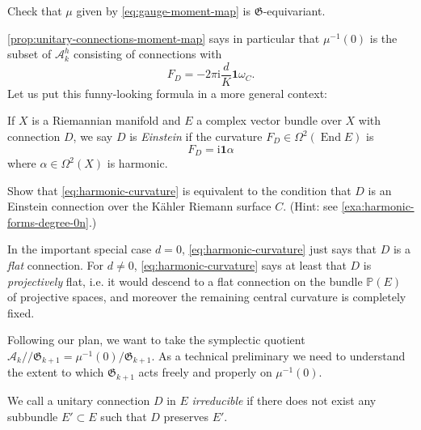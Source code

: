 \documentclass[12pt,letterpaper,reqno]{article}
\numberwithin{equation}{section}
\newcommand{\fG}{{\mathfrak G}}
\newcommand{\cA}{\ensuremath{\mathcal A}}
\newcommand{\PP}{\ensuremath{\mathbb P}}
\newcommand{\kahler}{K\"ahler\xspace}
\newcommand{\kq}{/\!\!/}
\newcommand{\I}{{\mathrm i}}
\newcommand\bid{{\mathbf 1}}
\newcommand{\ti}[1]{\textit{#1}}
\DeclareMathOperator{\End}{End}
\begin{document}
\begin{exercise}
Check that $\mu$ given by \eqref{eq:gauge-moment-map}
is $\fG$-equivariant.
\end{exercise}

\autoref{prop:unitary-connections-moment-map} says in particular that 
$\mu^{-1}(0)$ is the subset of $\cA^h_k$
consisting of connections with
\begin{equation} \label{eq:harmonic-curvature}
  F_D = -2 \pi \I \frac{d}{K} \bid \omega_C.
\end{equation}
Let us put this funny-looking formula in a more general context:

\begin{defn} 
If $X$ is a Riemannian manifold and $E$ a complex
vector bundle over $X$ with connection $D$, we say $D$ is 
\ti{Einstein} if the curvature $F_D \in \Omega^2(\End E)$
is
\begin{equation}
  F_D = \I \bid \alpha
\end{equation}
where $\alpha \in \Omega^2(X)$ is harmonic.
\end{defn}

\begin{exercise} Show that \eqref{eq:harmonic-curvature}
is equivalent to the condition that $D$ is an Einstein 
connection over the \kahler Riemann surface $C$.
(Hint: see \autoref{exa:harmonic-forms-degree-0n}.)
\end{exercise}

In the important special case $d=0$, \eqref{eq:harmonic-curvature}
just says that $D$ is a \ti{flat} connection.
For $d \neq 0$, \eqref{eq:harmonic-curvature} says at least that $D$ is
\ti{projectively} flat, i.e. it would descend to a flat connection 
on the bundle $\PP(E)$ of projective spaces, and moreover the remaining
central curvature is completely fixed.

Following our plan, 
we want to take the symplectic quotient $\cA_k \kq \fG_{k+1} = \mu^{-1}(0) / \fG_{k+1}$.
As a technical preliminary we need to understand the extent to 
which $\fG_{k+1}$ acts freely and properly on $\mu^{-1}(0)$.

\begin{defn}
We call a unitary connection $D$ in $E$ \ti{irreducible} if there does not
exist any subbundle $E' \subset E$ such that $D$ preserves $E'$.
\end{defn}
\end{document}
